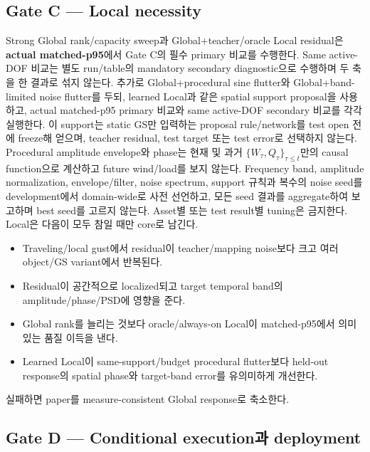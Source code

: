 \documentclass[11pt]{article}
\begin{document}
\subsection{Gate C --- Local necessity}

Strong Global rank/capacity sweep과 Global+teacher/oracle Local residual은
\textbf{actual matched-p95}에서 Gate C의 필수 primary 비교를 수행한다.
Same active-DOF 비교는 별도 run/table의 mandatory secondary diagnostic으로 수행하며 두 축을 한 결과로 섞지 않는다.
추가로 Global+procedural sine flutter와 Global+band-limited noise flutter를 두되,
learned Local과 같은 spatial support proposal을 사용하고, actual matched-p95 primary 비교와
same active-DOF secondary 비교를 각각 실행한다.
이 support는 static GS만 입력하는 proposal rule/network를 test open 전에 freeze해 얻으며,
teacher residual, test target 또는 test error로 선택하지 않는다. Procedural amplitude envelope와 phase는
현재 및 과거 \(\{W_\tau,Q_\tau\}_{\tau\le t}\)만의 causal function으로 계산하고 future wind/load를 보지 않는다.
Frequency band, amplitude normalization, envelope/filter, noise spectrum, support 규칙과 복수의 noise seed를
development에서 domain-wide로 사전 선언하고, 모든 seed 결과를 aggregate하여 보고하며 best seed를
고르지 않는다. Asset별 또는 test result별 tuning은 금지한다.
Local은 다음이 모두 참일 때만 core로 남긴다.
\begin{itemize}
  \item Traveling/local gust에서 residual이 teacher/mapping noise보다 크고 여러 object/GS variant에서 반복된다.
  \item Residual이 공간적으로 localized되고 target temporal band의 amplitude/phase/PSD에 영향을 준다.
  \item Global rank를 늘리는 것보다 oracle/always-on Local이 matched-p95에서 의미 있는 품질 이득을 낸다.
  \item Learned Local이 same-support/budget procedural flutter보다 held-out response의 spatial phase와
  target-band error를 유의미하게 개선한다.
\end{itemize}
실패하면 paper를 measure-consistent Global response로 축소한다.

\subsection{Gate D --- Conditional execution과 deployment}
\end{document}
